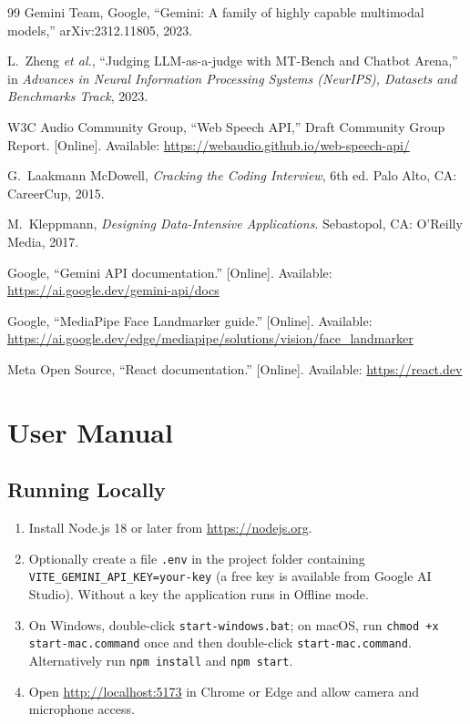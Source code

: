 \documentclass[12pt,a4paper,oneside]{report}
\begin{document}
\begin{thebibliography}{99}
 Gemini Team, Google, ``Gemini: A family of highly capable multimodal models,'' arXiv:2312.11805, 2023.

 L.~Zheng \emph{et al.}, ``Judging LLM-as-a-judge with MT-Bench and Chatbot Arena,'' in \emph{Advances in Neural Information Processing Systems (NeurIPS), Datasets and Benchmarks Track}, 2023.

 W3C Audio Community Group, ``Web Speech API,'' Draft Community Group Report. [Online]. Available: \url{https://webaudio.github.io/web-speech-api/}

 G.~Laakmann McDowell, \emph{Cracking the Coding Interview}, 6th ed. Palo Alto, CA: CareerCup, 2015.

 M.~Kleppmann, \emph{Designing Data-Intensive Applications}. Sebastopol, CA: O'Reilly Media, 2017.

 Google, ``Gemini API documentation.'' [Online]. Available: \url{https://ai.google.dev/gemini-api/docs}

 Google, ``MediaPipe Face Landmarker guide.'' [Online]. Available: \url{https://ai.google.dev/edge/mediapipe/solutions/vision/face_landmarker}

 Meta Open Source, ``React documentation.'' [Online]. Available: \url{https://react.dev}

\end{thebibliography}

\appendix

\chapter{User Manual}
\section{Running Locally}
\begin{enumerate}
  \item Install Node.js 18 or later from \url{https://nodejs.org}.
  \item Optionally create a file \texttt{.env} in the project folder containing \texttt{VITE\_GEMINI\_API\_KEY=your-key} (a free key is available from Google AI Studio). Without a key the application runs in Offline mode.
  \item On Windows, double-click \texttt{start-windows.bat}; on macOS, run \texttt{chmod +x start-mac.command} once and then double-click \texttt{start-mac.command}. Alternatively run \texttt{npm install} and \texttt{npm start}.
  \item Open \url{http://localhost:5173} in Chrome or Edge and allow camera and microphone access.
\end{enumerate}
\end{document}
